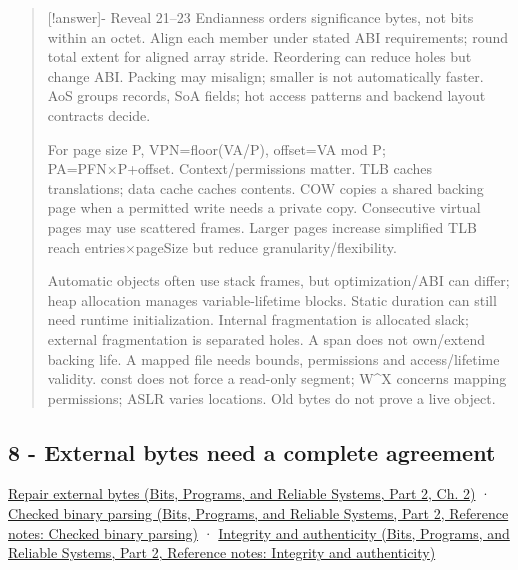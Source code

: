\begin{quote}
{[}!answer{]}- Reveal 21--23 Endianness orders significance bytes, not bits within an octet. Align each member under stated ABI requirements; round total extent for aligned array stride. Reordering can reduce holes but change ABI. Packing may misalign; smaller is not automatically faster. AoS groups records, SoA fields; hot access patterns and backend layout contracts decide.

For page size P, VPN=floor(VA/P), offset=VA mod P; PA=PFN×P+offset. Context/permissions matter. TLB caches translations; data cache caches contents. COW copies a shared backing page when a permitted write needs a private copy. Consecutive virtual pages may use scattered frames. Larger pages increase simplified TLB reach entries×pageSize but reduce granularity/flexibility.

Automatic objects often use stack frames, but optimization/ABI can differ; heap allocation manages variable-lifetime blocks. Static duration can still need runtime initialization. Internal fragmentation is allocated slack; external fragmentation is separated holes. A span does not own/extend backing life. A mapped file needs bounds, permissions and access/lifetime validity. const does not force a read-only segment; W\^{}X concerns mapping permissions; ASLR varies locations. Old bytes do not prove a live object.
\end{quote}

\subsection{8 - External bytes need a complete agreement}\label{appendix-ef4d27797a92-external-bytes-need-a-complete-agreement}

\hypertarget{appendix-ef4d27797a92-external-bytes-need-a-complete-agreement}{}

\href{../01-Bits-Programs-and-Reliable-Systems-P02/main.pdf\#nameddest=01-foundations-i-ch002-bytes-become-a-durable-agreement}{Repair external bytes (Bits, Programs, and Reliable Systems, Part 2, Ch. 2)} · \href{../01-Bits-Programs-and-Reliable-Systems-P02/main.pdf\#nameddest=appendix-652d81568de9}{Checked binary parsing (Bits, Programs, and Reliable Systems, Part 2, Reference notes: Checked binary parsing)} · \href{../01-Bits-Programs-and-Reliable-Systems-P02/main.pdf\#nameddest=appendix-cbe594d1ab0a}{Integrity and authenticity (Bits, Programs, and Reliable Systems, Part 2, Reference notes: Integrity and authenticity)}

